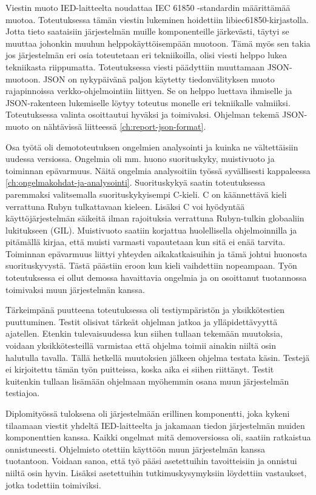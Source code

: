 Viestin muoto IED-laitteelta noudattaa IEC 61850 -standardin määrittämää muotoa. Toteutuksessa tämän viestin lukeminen hoidettiin libiec61850-kirjastolla. Jotta tieto saataisiin järjestelmän muille komponenteille järkevästi, täytyi se muuttaa johonkin muuhun helppokäyttöisempään muotoon. Tämä myös sen takia jos järjestelmän eri osia toteutetaan eri tekniikoilla, olisi viesti helppo lukea tekniikasta riippumatta. Toteutuksessa viesti päädyttiin muuttamaan JSON-muotoon. JSON on nykypäivänä paljon käytetty tiedonvälityksen muoto rajapinnoissa verkko-ohjelmointiin liittyen. Se on helppo luettava ihmiselle ja JSON-rakenteen lukemiselle löytyy toteutus monelle eri tekniikalle valmiiksi. Toteutuksessa valinta osoittautui hyväksi ja toimivaksi. Ohjelman tekemä JSON-muoto on nähtävissä liitteessä \ref{ch:report-json-format}.

Osa työtä oli demototeutuksen ongelmien analysointi ja kuinka ne vältettäisiin uudessa versiossa. Ongelmia oli mm. huono suorituskyky, muistivuoto ja toiminnan epävarmuus. Näitä ongelmia analysoitiin työssä syvällisesti kappaleessa \ref{ch:ongelmakohdat-ja-analysointi}. Suorituskykyä saatin toteutuksessa paremmaksi valitsemalla suorituskykyisempi C-kieli. C on käännettävä kieli verrattuna Rubyn tulkattavaan kieleen. Lisäksi C voi hyödyntää käyttöjärjestelmän säikeitä ilman rajoituksia verrattuna Rubyn-tulkin globaaliin lukitukseen (GIL). Muistivuoto saatiin korjattua huolellisella ohjelmoinnilla ja pitämällä kirjaa, että muisti varmasti vapautetaan kun sitä ei enää tarvita. Toiminnan epävarmuus liittyi yhteyden aikakatkaisuihin ja tämä johtui huonosta suorituskyvystä. Tästä päästiin eroon kun kieli vaihdettiin nopeampaan. Työn toteutuksessa ei ollut demossa havaittavia ongelmia ja on osoittanut tuotannossa toimivaksi muun järjestelmän kanssa.

Tärkeimpänä puutteena toteutuksessa oli testiympäristön ja yksikkötestien puuttuminen. Testit olisivat tärkeät ohjelman jatkoa ja ylläpidettävyyttä ajatellen. Etenkin tulevaisuudessa kun siihen tullaan tekemään muutoksia, voidaan yksikkötesteillä varmistaa että ohjelma toimii ainakin niiltä osin halutulla tavalla. Tällä hetkellä muutoksien jälkeen ohjelma testata käsin. Testejä ei kirjoitettu tämän työn puitteissa, koska aika ei siihen riittänyt. Testit kuitenkin tullaan lisämään ohjelmaan myöhemmin osana muun järjestelmän testiajoa.

Diplomityössä tuloksena oli järjestelmään erillinen komponentti, joka kykeni tilaamaan viestit yhdeltä IED-laitteelta ja jakamaan tiedon järjestelmän muiden komponenttien kanssa. Kaikki ongelmat mitä demoversiossa oli, saatiin ratkaistua onnistuneesti. Ohjelmisto otettiin käyttöön muun järjestelmän kanssa tuotantoon. Voidaan sanoa, että työ pääsi asetettuihin tavoitteisiin ja onnistui niiltä osin hyvin. Lisäksi asetettuihin tutkimuskysymyksiin löydettiin vastaukset, jotka todettiin toimiviksi.